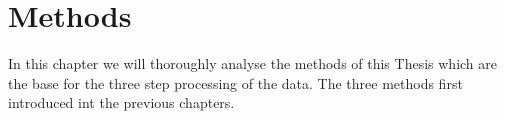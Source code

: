 \chapter{Methods}
In this chapter we will thoroughly analyse the methods of this Thesis which are the base for the three step processing of the data. The three methods first introduced int the previous chapters.\\
\\
